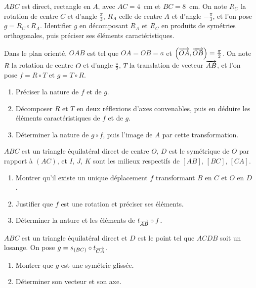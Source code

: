 \begin{annales}
$ABC$ est direct, rectangle en $A$, avec $AC = 4$~cm et $BC = 8$~cm. On note
$R_{C}$ la rotation de centre $C$ et d'angle $\frac{\pi}{3}$, $R_{A}$ celle de
centre $A$ et d'angle $-\frac{\pi}{3}$, et l'on pose $g = R_{C} \circ R_{A}$.
Identifier $g$ en décomposant $R_{A}$ et $R_{C}$ en produits de symétries
orthogonales, puis préciser ses éléments caractéristiques.

Dans le plan orienté, $OAB$ est tel que $OA = OB = a$ et
$\left(\overrightarrow{OA},\overrightarrow{OB}\right) = \frac{\pi}{2}$. On note $R$ la rotation de
centre $O$ et d'angle $\frac{\pi}{2}$, $T$ la translation de vecteur
$\overrightarrow{AB}$, et l'on pose $f = R \circ T$ et $g = T \circ R$.
\begin{enumerate}[label=\textbf{\alph*)}, leftmargin=*, itemsep=0.15em]
  \item Préciser la nature de $f$ et de $g$.
  \item Décomposer $R$ et $T$ en deux réflexions d'axes convenables, puis en
        déduire les éléments caractéristiques de $f$ et de $g$.
  \item Déterminer la nature de $g \circ f$, puis l'image de $A$ par cette
        transformation.
\end{enumerate}

$ABC$ est un triangle équilatéral direct de centre $O$, $D$ est le symétrique
de $O$ par rapport à $(AC)$, et $I$, $J$, $K$ sont les milieux respectifs de
$[AB]$, $[BC]$, $[CA]$.
\begin{enumerate}[label=\textbf{\alph*)}, leftmargin=*, itemsep=0.15em]
  \item Montrer qu'il existe un unique déplacement $f$ transformant $B$ en $C$
        et $O$ en $D$.
  \item Justifier que $f$ est une rotation et préciser ses éléments.
  \item Déterminer la nature et les éléments de
        $t_{\overrightarrow{AB}} \circ f$.
\end{enumerate}

$ABC$ est un triangle équilatéral direct et $D$ est le point tel que $ACDB$
soit un losange. On pose $g = s_{(BC)} \circ t_{\overrightarrow{CA}}$.
\begin{enumerate}[label=\textbf{\alph*)}, leftmargin=*, itemsep=0.15em]
  \item Montrer que $g$ est une symétrie glissée.
  \item Déterminer son vecteur et son axe.
\end{enumerate}
\end{annales}

